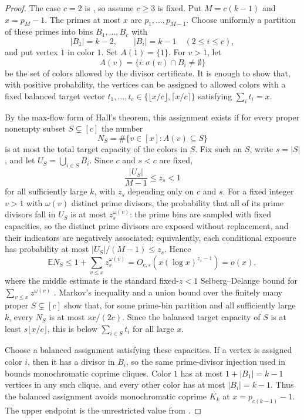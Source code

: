 \documentclass[11pt]{article}
\theoremstyle{plain}
\theoremstyle{definition}
\theoremstyle{remark}
\begin{document}
\begin{proof}
The case $c=2$ is , so assume $c\ge3$ is fixed.
Put $M=c(k-1)$ and $x=p_M-1$.  The primes at most $x$ are
$p_1,\ldots,p_{M-1}$.  Choose uniformly a partition of these primes into
bins $B_1,\ldots,B_c$ with
\[
  |B_1|=k-2,\qquad |B_i|=k-1\quad(2\le i\le c),
\]
and put vertex $1$ in color $1$.  Set $A(1)=\{1\}$.  For $v>1$, let
\[
  A(v)=\{i:\sigma(v)\cap B_i\ne\emptyset\}
\]
be the set of colors allowed by the divisor certificate.  It is enough to
show that, with positive probability, the vertices can be assigned to allowed
colors with a fixed balanced target vector
$t_1,\ldots,t_c\in\{\lfloor x/c\rfloor,\lceil x/c\rceil\}$ satisfying
$\sum_i t_i=x$.

By the max-flow form of Hall's theorem, this assignment exists if for every
proper nonempty subset $S\subsetneq[c]$ the number
\[
  N_S=\#\{v\in[x]:A(v)\subseteq S\}
\]
is at most the total target capacity of the colors in $S$.  Fix such an $S$,
write $s=|S|$, and let $U_S=\bigcup_{i\in S}B_i$.  Since $c$ and $s<c$ are
fixed,
\[
  \frac{|U_S|}{M-1}\le z_s<1
\]
for all sufficiently large $k$, with $z_s$ depending only on $c$ and $s$.
For a fixed integer $v>1$ with $\omega(v)$ distinct prime divisors, the
probability that all of its prime divisors fall in $U_S$ is at most
$z_s^{\omega(v)}$: the prime bins are sampled with fixed capacities, so the
distinct prime divisors are exposed without replacement, and their indicators
are negatively associated; equivalently, each conditional exposure has
probability at most $|U_S|/(M-1)\le z_s$.  Hence
\[
  \mathbb E N_S
  \le 1+\sum_{v\le x} z_s^{\omega(v)}
  =O_{c,s}\!\left(x(\log x)^{z_s-1}\right)
  =o(x),
\]
where the middle estimate is the standard fixed-$z<1$ Selberg--Delange bound
for $\sum_{v\le x}z^{\omega(v)}$ \cite[Chapter II.5]{tenenbaum2015}.
Markov's inequality and a union bound over the finitely many proper
$S\subsetneq[c]$ show that, for some prime-bin partition and all sufficiently
large $k$, every $N_S$ is at most $s x/(2c)$.  Since the balanced target
capacity of $S$ is at least $s\lfloor x/c\rfloor$, this is below
$\sum_{i\in S}t_i$ for all large $x$.

Choose a balanced assignment satisfying these capacities.  If a vertex is
assigned color $i$, then it has a divisor in $B_i$, so the same
prime-divisor injection used in  bounds monochromatic coprime
cliques.  Color $1$ has at most $1+|B_1|=k-1$ vertices in any such clique,
and every other color has at most $|B_i|=k-1$.  Thus the balanced assignment
avoids monochromatic coprime $K_k$ at $x=p_{c(k-1)}-1$.  The upper endpoint is
the unrestricted value from .
\end{proof}
\end{document}
